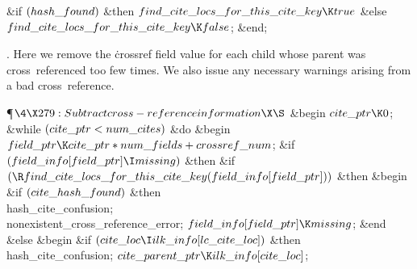 \&{if} $(\\{hash\_found})$ \1\&{then}\5
$\\{find\_cite\_locs\_for\_this\_cite\_key}\K\\{true}$\6
\4\&{else} $\\{find\_cite\_locs\_for\_this\_cite\_key}\K\\{false}$;\2\6
\&{end};\par
\fi

.
Here we remove the \.{crossref} field value for each child whose
parent was cross~referenced too few times.  We also issue any
necessary warnings arising from a bad cross~reference.

\Y\P$\4\X279:Subtract cross-reference information\X\S$\6
\&{begin} $\\{cite\_ptr}\K0$;\6
\&{while} $(\\{cite\_ptr}<\\{num\_cites})$ \1\&{do}\6
\&{begin} $\\{field\_ptr}\K\\{cite\_ptr}\ast\\{num\_fields}+\\{crossref%
\_num}$;\6
\&{if} $(\\{field\_info}[\\{field\_ptr}]\I\\{missing})$ \1\&{then}\6
\&{if} $(\R\\{find\_cite\_locs\_for\_this\_cite\_key}(\\{field\_info}[\\{field%
\_ptr}]))$ \1\&{then}\6
\&{begin} \6
\&{if} $(\\{cite\_hash\_found})$ \1\&{then}\5
\\{hash\_cite\_confusion};\2\6
\\{nonexistent\_cross\_reference\_error};\5
$\\{field\_info}[\\{field\_ptr}]\K\\{missing}$;\6
\&{end}\6
\4\&{else} \&{begin} \6
\&{if} $(\\{cite\_loc}\I\\{ilk\_info}[\\{lc\_cite\_loc}])$ \1\&{then}\5
\\{hash\_cite\_confusion};\2\6
$\\{cite\_parent\_ptr}\K\\{ilk\_info}[\\{cite\_loc}]$;\6
